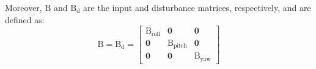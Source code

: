 \documentclass[3p,times]{elsarticle}
\begin{document}
Moreover, $\boldsymbol{\mathrm{B}}$ and $\boldsymbol{\mathrm{B_d}}$ are the input and disturbance matrices, respectively, and are defined as:
\begin{equation}
	\boldsymbol{\mathrm{B}} = \boldsymbol{\mathrm{B_d}} = 
	\begin{bmatrix}
		\boldsymbol{{\mathrm{B_{\text{roll}}}}} & \boldsymbol{0} & \boldsymbol{0}\\
		\boldsymbol{0} & \boldsymbol{{\mathrm{B_{\text{pitch}}}}} & \boldsymbol{0} \\
		\boldsymbol{0} & \boldsymbol{0} & \boldsymbol{{\mathrm{B_{\text{yaw}}}}}
	\end{bmatrix}
\end{equation}

\end{document}
